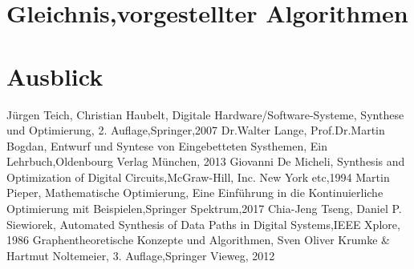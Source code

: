 \documentclass[conference]{IEEEtran}
\begin{document}
\section{Gleichnis,vorgestellter Algorithmen}
\section{Ausblick}
\begin{thebibliography}{00}
 Jürgen Teich, Christian Haubelt, Digitale Hardware/Software-Systeme, Synthese und Optimierung, 2. Auflage,Springer,2007
 Dr.Walter Lange, Prof.Dr.Martin Bogdan, Entwurf und Syntese von Eingebetteten Systhemen, Ein Lehrbuch,Oldenbourg Verlag München, 2013
 Giovanni De Micheli, Synthesis and Optimization of Digital Circuits,McGraw-Hill, Inc. New York etc,1994
 Martin Pieper, Mathematische Optimierung, Eine Einführung in die Kontinuierliche Optimierung mit Beispielen,Springer Spektrum,2017
 Chia-Jeng Tseng, Daniel P. Siewiorek, Automated Synthesis of Data Paths in Digital Systems,IEEE Xplore, 1986
 Graphentheoretische Konzepte und Algorithmen, Sven Oliver Krumke \& Hartmut Noltemeier, 3. Auflage,Springer Vieweg, 2012
\end{thebibliography}
\listoffigures
\listoftables
\vspace{12pt}
\end{document}
